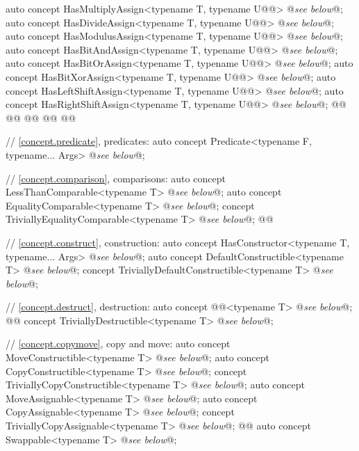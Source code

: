 \documentclass[american,twoside]{book}
\begin{document}
\begin{codeblock}
{  auto concept HasMultiplyAssign<typename T, typename U@@> @\textit{see below}@;
  auto concept HasDivideAssign<typename T, typename U@@> @\textit{see below}@;
  auto concept HasModulusAssign<typename T, typename U@@> @\textit{see below}@;
  auto concept HasBitAndAssign<typename T, typename U@@> @\textit{see below}@;
  auto concept HasBitOrAssign<typename T, typename U@@> @\textit{see below}@;
  auto concept HasBitXorAssign<typename T, typename U@@> @\textit{see below}@;
  auto concept HasLeftShiftAssign<typename T, typename U@@> @\textit{see below}@;
  auto concept HasRightShiftAssign<typename T, typename U@@> @\textit{see below}@;
  @@
  @@
  @@
  @@
  @@

  // \ref{concept.predicate}, predicates:
  auto concept Predicate<typename F, typename... Args> @\textit{see below}@;

  // \ref{concept.comparison}, comparisons:
  auto concept LessThanComparable<typename T> @\textit{see below}@;
  auto concept EqualityComparable<typename T> @\textit{see below}@;
  concept TriviallyEqualityComparable<typename T> @\textit{see below}@;
  @@

  // \ref{concept.construct}, construction:
  auto concept HasConstructor<typename T, typename... Args> @\textit{see below}@;
  auto concept DefaultConstructible<typename T> @\textit{see below}@;
  concept TriviallyDefaultConstructible<typename T> @\textit{see below}@;

  // \ref{concept.destruct}, destruction:
  auto concept @@<typename T> @\textit{see below}@;
  @@
  concept TriviallyDestructible<typename T> @\textit{see below}@;

  // \ref{concept.copymove}, copy and move:
  auto concept MoveConstructible<typename T> @\textit{see below}@;
  auto concept CopyConstructible<typename T> @\textit{see below}@;
  concept TriviallyCopyConstructible<typename T> @\textit{see below}@;
  auto concept MoveAssignable<typename T> @\textit{see below}@;
  auto concept CopyAssignable<typename T> @\textit{see below}@;
  concept TriviallyCopyAssignable<typename T> @\textit{see below}@;
  @@
  auto concept Swappable<typename T> @\textit{see below}@;

}
\end{codeblock}
\end{document}
